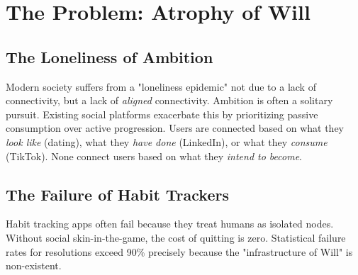 \documentclass[11pt,a4paper,oneside]{article}
\begin{document}
\newpage
\begin{abstract}
\noindent
Praxis is a \textbf{goal-aligned social operating system} designed to bridge the gap between individual ambition and social infrastructure. While traditional social networks optimize for engagement (attention capture) and dating apps optimize for superficiality (appearance matching), Praxis optimizes for \textbf{shared trajectory}. By encoding human ambition into a multi-domain hierarchical goal tree and utilizing high-dimensional vector embeddings, Praxis identifies and pairs individuals whose "Wills" are semantically aligned. 

The platform introduces the \textbf{Reliability Score} as a novel metric for social capital, the \textbf{Social Streak System} as a behavioral commitment device, and the \textbf{Axiom AI Coach} as a corrective feedback loop. This document details the mathematical underpinnings of the $S_{AB}$ matching algorithm, the technical architecture leveraging pgvector and Gemini, and the business model for the next era of value-driven social connectivity.
\end{abstract}

\tableofcontents

\newpage
\section{The Problem: Atrophy of Will}

\subsection{The Loneliness of Ambition}
Modern society suffers from a "loneliness epidemic" not due to a lack of connectivity, but a lack of \textit{aligned} connectivity. Ambition is often a solitary pursuit. Existing social platforms exacerbate this by prioritizing passive consumption over active progression. Users are connected based on what they \textit{look like} (dating), what they \textit{have done} (LinkedIn), or what they \textit{consume} (TikTok). None connect users based on what they \textit{intend to become}.

\subsection{The Failure of Habit Trackers}
Habit tracking apps often fail because they treat humans as isolated nodes. Without social skin-in-the-game, the cost of quitting is zero. Statistical failure rates for resolutions exceed 90\% precisely because the "infrastructure of Will" is non-existent.
\end{document}
